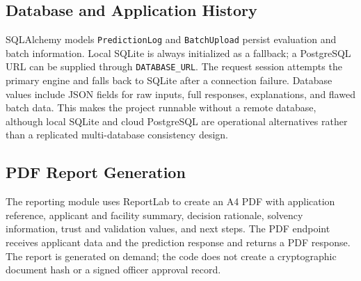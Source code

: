 \clearpage
\begingroup
\setlength{\intextsep}{5pt}
\setlength{\textfloatsep}{8pt}
\setlength{\floatsep}{8pt}
\renewcommand{\topfraction}{1.0}
\renewcommand{\bottomfraction}{1.0}
\renewcommand{\textfraction}{0.0}

\clearpage


\clearpage


\clearpage
\endgroup

\subsection{Database and Application History}
SQLAlchemy models \texttt{PredictionLog} and \texttt{BatchUpload} persist evaluation and batch information. Local SQLite is always initialized as a fallback; a PostgreSQL URL can be supplied through \texttt{DATABASE\_URL}. The request session attempts the primary engine and falls back to SQLite after a connection failure. Database values include JSON fields for raw inputs, full responses, explanations, and flawed batch data. This makes the project runnable without a remote database, although local SQLite and cloud PostgreSQL are operational alternatives rather than a replicated multi-database consistency design.

\subsection{PDF Report Generation}
The reporting module uses ReportLab to create an A4 PDF with application reference, applicant and facility summary, decision rationale, solvency information, trust and validation values, and next steps. The PDF endpoint receives applicant data and the prediction response and returns a PDF response. The report is generated on demand; the code does not create a cryptographic document hash or a signed officer approval record.

